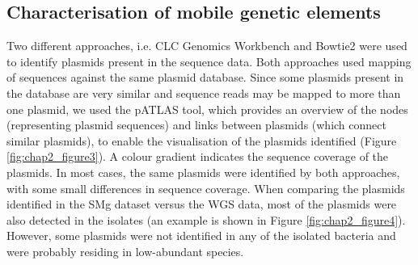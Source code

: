 \subsection{Characterisation of mobile genetic elements}

Two different approaches, i.e. CLC Genomics Workbench and Bowtie2 were used to identify plasmids present in the sequence data. 
Both approaches used mapping of sequences against the same plasmid database. 
Since some plasmids present in the database are very similar and sequence reads may be mapped to more than one plasmid, we used the pATLAS tool, which provides an overview of the nodes (representing plasmid sequences) and links between plasmids (which connect similar plasmids), to enable the visualisation of the plasmids identified (Figure \ref{fig:chap2_figure3}). 
A colour gradient indicates the sequence coverage of the plasmids. 
In most cases, the same plasmids were identified by both approaches, with some small differences in sequence coverage. 
When comparing the plasmids identified in the \ac{SMg} dataset versus the \ac{WGS} data, most of the plasmids were also detected in the isolates (an example is shown in Figure \ref{fig:chap2_figure4}). 
However, some plasmids were not identified in any of the isolated bacteria and were probably residing in low-abundant species.

